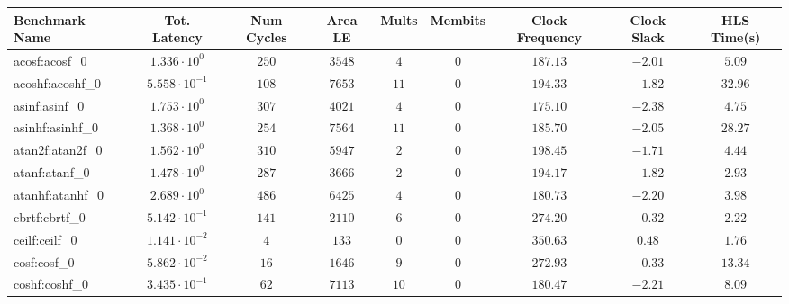 \begin{tabular}{|l|c|c|c|c|c|c|c|c|}
\hline
Benchmark Name               & Tot. Latency            & Num Cycles & Area LE    & Mults   & Membits & Clock Frequency & Clock Slack & HLS Time(s) \\
\hline
acosf:acosf\_0               & $ 1.336 \cdot 10^{0}  $ & $ 250    $ & $ 3548   $ & $ 4   $ & $ 0   $ & $ 187.13      $ & $ -2.01   $ & $ 5.09    $ \\
acoshf:acoshf\_0             & $ 5.558 \cdot 10^{-1} $ & $ 108    $ & $ 7653   $ & $ 11  $ & $ 0   $ & $ 194.33      $ & $ -1.82   $ & $ 32.96   $ \\
asinf:asinf\_0               & $ 1.753 \cdot 10^{0}  $ & $ 307    $ & $ 4021   $ & $ 4   $ & $ 0   $ & $ 175.10      $ & $ -2.38   $ & $ 4.75    $ \\
asinhf:asinhf\_0             & $ 1.368 \cdot 10^{0}  $ & $ 254    $ & $ 7564   $ & $ 11  $ & $ 0   $ & $ 185.70      $ & $ -2.05   $ & $ 28.27   $ \\
atan2f:atan2f\_0             & $ 1.562 \cdot 10^{0}  $ & $ 310    $ & $ 5947   $ & $ 2   $ & $ 0   $ & $ 198.45      $ & $ -1.71   $ & $ 4.44    $ \\
atanf:atanf\_0               & $ 1.478 \cdot 10^{0}  $ & $ 287    $ & $ 3666   $ & $ 2   $ & $ 0   $ & $ 194.17      $ & $ -1.82   $ & $ 2.93    $ \\
atanhf:atanhf\_0             & $ 2.689 \cdot 10^{0}  $ & $ 486    $ & $ 6425   $ & $ 4   $ & $ 0   $ & $ 180.73      $ & $ -2.20   $ & $ 3.98    $ \\
cbrtf:cbrtf\_0               & $ 5.142 \cdot 10^{-1} $ & $ 141    $ & $ 2110   $ & $ 6   $ & $ 0   $ & $ 274.20      $ & $ -0.32   $ & $ 2.22    $ \\
ceilf:ceilf\_0               & $ 1.141 \cdot 10^{-2} $ & $ 4      $ & $ 133    $ & $ 0   $ & $ 0   $ & $ 350.63      $ & $ 0.48    $ & $ 1.76    $ \\
cosf:cosf\_0                 & $ 5.862 \cdot 10^{-2} $ & $ 16     $ & $ 1646   $ & $ 9   $ & $ 0   $ & $ 272.93      $ & $ -0.33   $ & $ 13.34   $ \\
coshf:coshf\_0               & $ 3.435 \cdot 10^{-1} $ & $ 62     $ & $ 7113   $ & $ 10  $ & $ 0   $ & $ 180.47      $ & $ -2.21   $ & $ 8.09    $ \\

\end{tabular}
